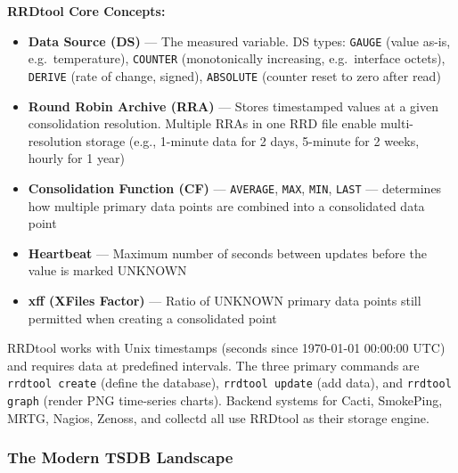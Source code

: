 \documentclass[11pt,letterpaper]{article}
\begin{document}
\textbf{RRDtool Core Concepts:}

\begin{itemize}[noitemsep]
  \item \textbf{Data Source (DS)} --- The measured variable. DS types: \texttt{GAUGE} (value as-is, e.g.\ temperature), \texttt{COUNTER} (monotonically increasing, e.g.\ interface octets), \texttt{DERIVE} (rate of change, signed), \texttt{ABSOLUTE} (counter reset to zero after read)
  \item \textbf{Round Robin Archive (RRA)} --- Stores timestamped values at a given consolidation resolution. Multiple RRAs in one RRD file enable multi-resolution storage (e.g., 1-minute data for 2 days, 5-minute for 2 weeks, hourly for 1 year)
  \item \textbf{Consolidation Function (CF)} --- \texttt{AVERAGE}, \texttt{MAX}, \texttt{MIN}, \texttt{LAST} --- determines how multiple primary data points are combined into a consolidated data point
  \item \textbf{Heartbeat} --- Maximum number of seconds between updates before the value is marked UNKNOWN
  \item \textbf{xff (XFiles Factor)} --- Ratio of UNKNOWN primary data points still permitted when creating a consolidated point
\end{itemize}

RRDtool works with Unix timestamps (seconds since 1970-01-01 00:00:00 UTC) and requires data at predefined intervals. The three primary commands are \texttt{rrdtool create} (define the database), \texttt{rrdtool update} (add data), and \texttt{rrdtool graph} (render PNG time-series charts). Backend systems for Cacti, SmokePing, MRTG, Nagios, Zenoss, and collectd all use RRDtool as their storage engine.

\subsubsection{The Modern TSDB Landscape}
\end{document}
